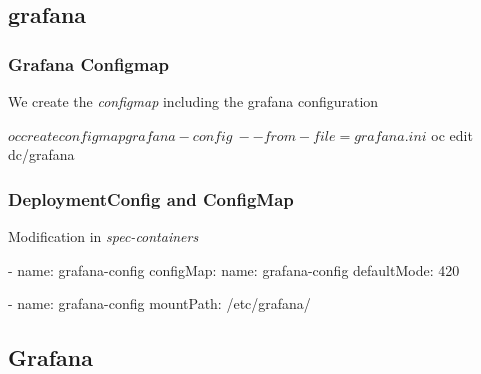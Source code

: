 \subsection{grafana}

\begin{frame}[fragile]
  \frametitle{Grafana Configmap}
  We create the \emph{configmap} including the grafana configuration \\
  \begin{bashcode}
    $ oc create configmap grafana-config \
    --from-file=grafana.ini
    $ oc edit dc/grafana
  \end{bashcode}
\end{frame}

\begin{frame}[fragile]
  \frametitle{DeploymentConfig and ConfigMap}
  Modification in \emph{spec-containers}
  \begin{yamlcode}
    - name: grafana-config
      configMap:
        name: grafana-config
        defaultMode: 420
  \end{yamlcode}

  \begin{yamlcode}
    - name: grafana-config
      mountPath: /etc/grafana/
  \end{yamlcode}
\end{frame}

\subsection{Grafana}